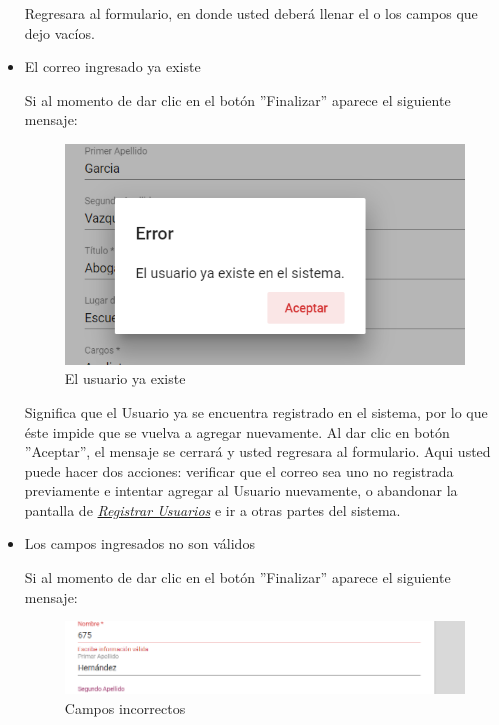 \begin{itemize}
\begin{figure}[H]
                         \end{figure}

                           Regresara  al formulario, en donde usted deberá llenar el o los campos que dejo vacíos.
                          \item El correo ingresado ya existe

                        Si al momento de dar clic en el botón ''Finalizar'' aparece el siguiente mensaje:

                        \begin{figure}[H]
                        	\centering
                        	\includegraphics[width=0.4\linewidth]{images/SP5/MSG36}
                        	\caption{El usuario ya existe}
                        	\label{mensaje36}

                        \end{figure}

                        Significa que el Usuario ya se encuentra registrado en el sistema, por lo que éste impide que se vuelva a agregar nuevamente. Al dar clic en botón ''Aceptar'', el mensaje se cerrará y usted regresara al formulario. Aqui usted puede hacer dos acciones: verificar que el correo sea uno no registrada previamente e intentar agregar al Usuario nuevamente, o abandonar la pantalla de \hyperlink{registrarUs}{\textit{Registrar Usuarios}} e ir a otras partes del sistema.

                        \item Los campos ingresados no son válidos

                            Si al momento de dar clic en el botón ''Finalizar'' aparece el siguiente mensaje:
                            \clearpage
                                \begin{figure}[H]
                         	\centering
                         	\includegraphics[width=0.4\linewidth]{images/SP5/MSG35}
                         	\caption{Campos incorrectos}
                         	\label{mensaje35}


\end{figure}
\end{itemize}
